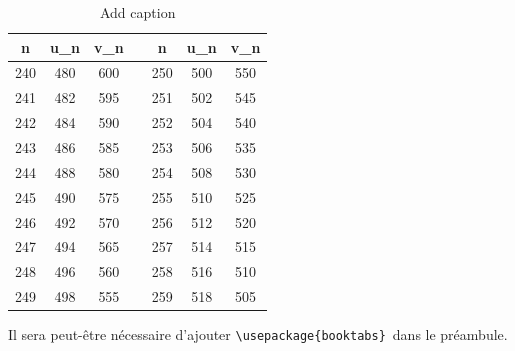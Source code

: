 \documentclass[12pt,french]{article}
\begin{document}
\begin{spacing}{1.2}
\begin{table}[htbp]
  \centering
  \caption{Add caption}
    \begin{tabular}{ccccccc}
    \toprule
    \textbf{n} & \textbf{u\_n} & \textbf{v\_n} & \textbf{} & \textbf{n} & \textbf{u\_n} & \textbf{v\_n} \\
    \midrule
    240   & 480   & 600   &       & 250   & 500   & 550 \\
    241   & 482   & 595   &       & 251   & 502   & 545 \\
    242   & 484   & 590   &       & 252   & 504   & 540 \\
    243   & 486   & 585   &       & 253   & 506   & 535 \\
    244   & 488   & 580   &       & 254   & 508   & 530 \\
    245   & 490   & 575   &       & 255   & 510   & 525 \\
    246   & 492   & 570   &       & 256   & 512   & 520 \\
    247   & 494   & 565   &       & 257   & 514   & 515 \\
    248   & 496   & 560   &       & 258   & 516   & 510 \\
    249   & 498   & 555   &       & 259   & 518   & 505 \\
    \bottomrule
    \end{tabular}%
  \label{tab:addlabel}%
\end{table}%

\color{red}
Il sera peut-être nécessaire d'ajouter \verb=\usepackage{booktabs}=\, dans le préambule.
\color{black}



\end{spacing}
\end{document}
